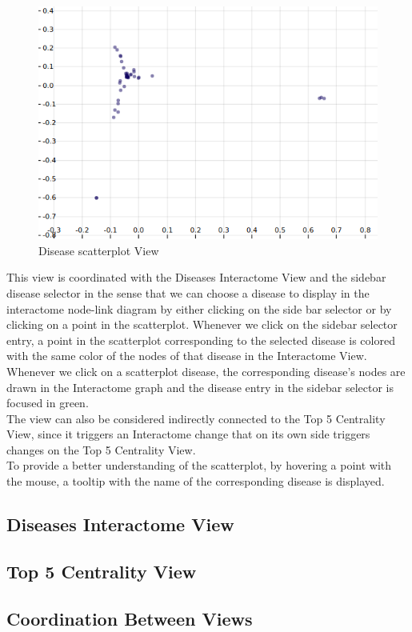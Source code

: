 \documentclass[12pt,twocolumn,twoside]{article}
\begin{document}
	\begin{figure}
		\includegraphics[width=.95\linewidth]{disease-scatterplot-mds.png}
		\caption{Disease scatterplot View}
		\label{scatter}
	\end{figure}
This view is coordinated with the Diseases Interactome View and the sidebar disease selector in the sense that we can choose a disease to display in the interactome node-link diagram by either clicking on the side bar selector or by clicking on a point in the scatterplot. Whenever we click on the sidebar selector entry, a point in the scatterplot corresponding to the selected disease is colored with the same color of the nodes of that disease in the Interactome View. Whenever we click on a scatterplot disease, the corresponding disease's nodes are drawn in the Interactome graph and the disease entry in the sidebar selector is focused in green.\\ The view can also be considered indirectly connected to the Top 5 Centrality View, since it triggers an Interactome change that on its own side triggers changes on the Top 5 Centrality View. \\To provide a better understanding of the scatterplot, by hovering a point with the mouse, a tooltip with the name of the corresponding disease is displayed. 
\subsection*{Diseases Interactome View}
\subsection*{Top 5 Centrality View}
\subsection*{Coordination Between Views}




\clearpage

 
\end{document}
